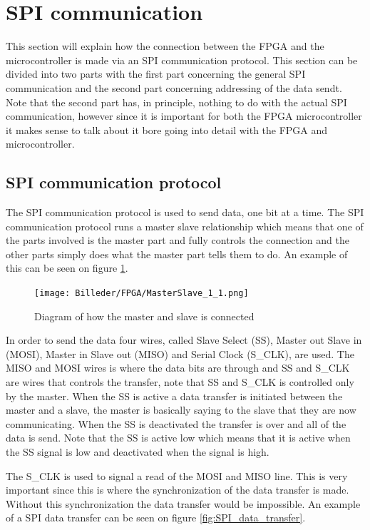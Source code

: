 \section{SPI communication}

This section will explain how the connection between the FPGA and the microcontroller is made via an SPI communication protocol. This section can be divided into two parts with the first part concerning the general SPI communication and the second part concerning addressing of the data sendt. Note that the second part has, in principle, nothing to do with the actual SPI communication, however since it is important for both the FPGA microcontroller it makes sense to talk about it bore going into detail with the FPGA and microcontroller.

\subsection{SPI communication protocol}

The SPI communication protocol is used to send data, one bit at a time. The SPI communication protocol runs a master slave relationship which means that one of the parts involved is the master part and fully controls the connection and the other parts simply does what the master part tells them to do. An example of this can be seen on figure \ref{fig:MasterSlave_1_1}.

\begin{figure}[h!]
\centering
\texttt{[image: Billeder/FPGA/MasterSlave\_1\_1.png]}
\caption{ Diagram of how the master and slave is connected  }
\label{fig:MasterSlave_1_1}
\end{figure}

In order to send the data four wires, called Slave Select (SS), Master out Slave in (MOSI), Master in Slave out (MISO) and Serial Clock (S\_CLK), are used. The MISO and MOSI wires is where the data bits are through and SS and S\_CLK are wires that controls the transfer, note that SS and S\_CLK is controlled only by the master. When the SS is active a data transfer is initiated between the master and a slave, the master is basically saying to the slave that they are now communicating. When the SS is deactivated the transfer is over and all of the data is send. Note that the SS is active low which means that it is active when the SS signal is low and deactivated when the signal is high.  

\newpage

The S\_CLK is used to signal a read of the MOSI and MISO line. This is very important since this is where the synchronization of the data transfer is made. Without this synchronization the data transfer would be impossible.
An example of a SPI data transfer can be seen on figure \ref{fig:SPI_data_transfer}.

